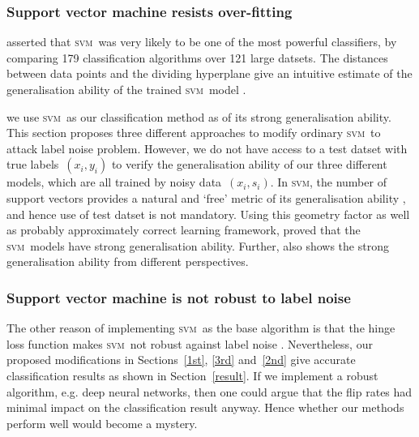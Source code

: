 \documentclass[12pt]{article} %
\newcommand{\svm}{\textsc{svm}}
\begin{document}
\subsubsection{Support vector machine resists over-fitting}\label{sec:over}
\citet{Fernandez-Delgado:2014:WNH:2627435.2697065} asserted that \svm\ was very likely to be one of the most powerful classifiers, by comparing 179 classification algorithms over 121 large datsets. The distances between data points and the dividing hyperplane give an intuitive estimate of the generalisation ability of the trained \svm\ model \citep{hastie01statisticallearning}.


we use \svm\ as our classification method as of its strong generalisation ability. %
This section proposes three different approaches to modify ordinary \svm\ to attack label noise problem. However, we do not have access to a test datset with true labels~$(x_i,y_i)$ to verify the generalisation ability of our three different models, which are all trained by noisy data~$(x_i,s_i)$. In \svm , the number of support vectors provides a natural and `free' metric of its generalisation ability  \citep{hastie01statisticallearning}, and hence use of test datset is not mandatory. Using this geometry factor as well as probably approximately correct learning framework,  \citet{NIPS2012_4500} proved that the  \svm\ models have strong generalisation ability. Further,  \citep{Cortes1995,Seeger:2003:PGE:944919.944929} also shows the strong generalisation ability from different perspectives.

\subsubsection{Support vector machine is not robust to label noise}

The other reason of implementing \svm\ as the base algorithm is that the hinge loss function makes \svm\ not robust against label noise \citep{frenay2014classification}. Nevertheless, our proposed modifications in Sections~\ref{1st}, \ref{3rd} and~\ref{2nd} give accurate classification results as shown in Section~\ref{result}. If we implement a robust algorithm, e.g. deep neural networks, then one could argue that the flip rates had minimal impact on the classification result anyway. Hence whether our methods perform well would become a mystery.

\end{document}
